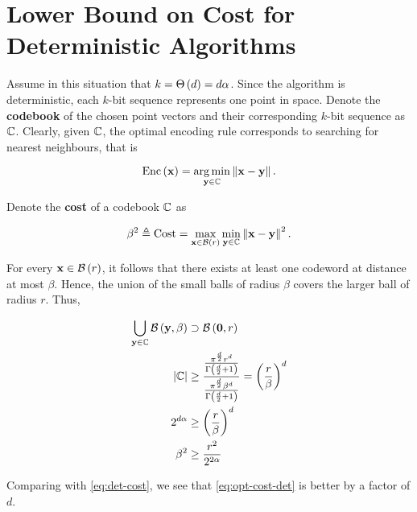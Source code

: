 \documentclass[twoside]{article}
\begin{document}
\section{Lower Bound on Cost for Deterministic Algorithms}

Assume in this situation that \(k = \Theta\left(d\right) = d\alpha\). Since the
algorithm is deterministic, each \(k\)-bit sequence represents one point in
space. Denote the \textbf{codebook} of the chosen point vectors and their
corresponding \(k\)-bit sequence as \(\mathbb C\). Clearly, given \(\mathbb C\), the optimal
encoding rule corresponds to searching for nearest neighbours, that is

\begin{equation}
    \mathrm{Enc}\left(\boldsymbol{\mathbf{x}}\right) = \operatorname*{arg\,min}_{\boldsymbol{\mathbf{y}}\in\mathbb C}\left\lVert\boldsymbol{\mathbf{x}}-\boldsymbol{\mathbf{y}}\right\rVert.
    \label{eq:enc-opt}
\end{equation}

Denote the \textbf{cost} of a codebook \(\mathbb C\) as

\begin{equation}
    \beta^2 \triangleq \mathrm{Cost} = \max_{\boldsymbol{\mathbf{x}}\in\mathcal B\left(r\right)}\min_{\boldsymbol{\mathbf{y}}\in\mathbb C}\left\lVert\boldsymbol{\mathbf{x}}-\boldsymbol{\mathbf{y}}\right\rVert^2.
    \label{eq:cost-codebook}
\end{equation}

For every \(\boldsymbol{\mathbf{x}}\in\mathcal B\left(r\right)\), it follows that there exists at least one
codeword at distance at most \(\beta\). Hence, the union of the small balls of
radius \(\beta\) covers the larger ball of radius \(r\). Thus,

\begin{align}
    \bigcup_{\boldsymbol{\mathbf{y}}\in\mathbb C}\mathcal B\left(\boldsymbol{\mathbf{y}},\beta\right) &\supset \mathcal B\left(\boldsymbol{\mathbf{0}},r\right) \\
    \left\vert\mathbb C\right\vert &\ge \frac{\frac{\pi^{\frac{d}{2}}r^d}{\Gamma\left(\frac{d}{2}+1\right)}}{\frac{\pi^{\frac{d}{2}}\beta^d}{\Gamma\left(\frac{d}{2}+1\right)}} = \left(\frac{r}{\beta}\right)^d \\
    2^{d\alpha} &\ge \left(\frac{r}{\beta}\right)^d \\
    \beta^2 &\ge \frac{r^2}{2^{2\alpha}}
    \label{eq:opt-cost-det}
\end{align}

Comparing with \eqref{eq:det-cost}, we see that \eqref{eq:opt-cost-det} is
better by a factor of \(d\).
\end{document}

